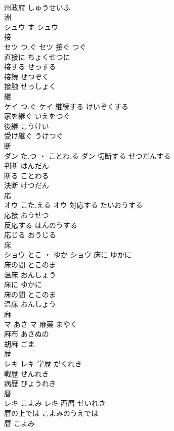 \documentclass[8pt]{extreport}
\begin{document}
\begin{CJK}{UTF8}{min}
\\	州政府	しゅうせいふ	
\\	洲	
\\	シュウ	す	シュウ																																			
\\	接	
\\	セツ	つ.ぐ	セツ	接ぐ	つぐ	
\\	直接に	ちょくせつに	
\\	接する	せっする	
\\	接続	せつぞく	
\\	接触	せっしょく	
\\	継	
\\	ケイ	つ.ぐ	ケイ	継続する	けいぞくする	
\\	家を継ぐ	いえをつぐ	
\\	後継	こうけい	
\\	受け継ぐ	うけつぐ	
\\	断	
\\	ダン	た.つ ・ ことわ.る	ダン	切断する	せつだんする	
\\	判断	はんだん	
\\	断る	ことわる	
\\	決断	けつだん	
\\	応	
\\	オウ	こた.える	オウ	対応する	たいおうする	
\\	応接	おうせつ	
\\	反応する	はんのうする	
\\	応じる	おうじる	
\\	床	
\\	ショウ	とこ ・ ゆか	ショウ	床に	ゆかに	
\\	床の間	とこのま	
\\	温床	おんしょう	
\\	床に	ゆかに	
\\	床の間	とこのま	
\\	温床	おんしょう	
\\	麻	
\\	マ	あさ	マ	麻薬	まやく	
\\	麻布	あさぬの	
\\	胡麻	ごま	
\\	歴	
\\	レキ		レキ	学歴	がくれき	
\\	戦歴	せんれき	
\\	病歴	びょうれき	
\\	暦	
\\	レキ	こよみ	レキ	西暦	せいれき	
\\	暦の上では	こよみのうえでは	
\\	暦	こよみ	

\end{CJK}
\end{document}
